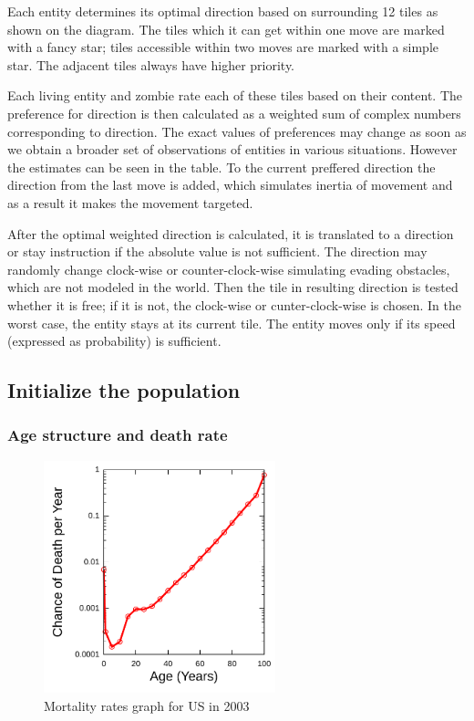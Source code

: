 \documentclass[a4paper]{article}
\begin{document}
Each entity determines its optimal direction based on surrounding 12 tiles as shown on the diagram.
The tiles which it can get within one move are marked with a fancy star; tiles accessible within two moves are marked with a simple star.
The adjacent tiles always have higher priority.

Each living entity and zombie rate each of these tiles based on their content.
The preference for direction is then calculated as a weighted sum of complex numbers corresponding to direction.
The exact values of preferences may change as soon as we obtain a broader set of observations of entities in various situations.
However the estimates can be seen in the table.
To the current preffered direction the direction from the last move is added, which simulates inertia of movement and as a result it makes the movement targeted.

After the optimal weighted direction is calculated, it is translated to a direction or stay instruction if the absolute value is not sufficient.
The direction may randomly change clock-wise or counter-clock-wise simulating evading obstacles, which are not modeled in the world.
Then the tile in resulting direction is tested whether it is free; if it is not, the clock-wise or cunter-clock-wise is chosen.
In the worst case, the entity stays at its current tile.
The entity moves only if its speed (expressed as probability) is sufficient.

\subsection{Initialize the population}

\subsubsection{Age structure and death rate}

\begin{figure}[ht]
    \centering
    \includegraphics[width=0.6\textwidth]{USGompertzCurve}
    \caption{Mortality rates graph for US in 2003}
\end{figure}
\end{document}
